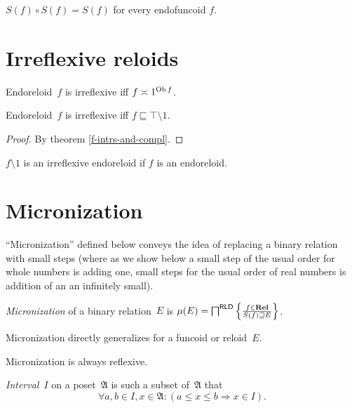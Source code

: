 \begin{conjecture}
$S(f)\circ S(f)=S(f)$ for every endofuncoid $f$.\end{conjecture}

\section{Irreflexive reloids}

\begin{defn}
Endoreloid~$f$ is irreflexive iff $f\asymp 1^{\operatorname{Ob} f}$.
\end{defn}

\begin{prop}
Endoreloid~$f$ is irreflexive iff $f\sqsubseteq \top\setminus 1$.
\end{prop}

\begin{proof}
By theorem \ref{f-intrs-and-compl}.
\end{proof}

\begin{obvious}
$f \setminus 1$ is an irreflexive endoreloid if $f$ is an endoreloid.
\end{obvious}

\section{Micronization}

``Micronization'' defined below conveys the idea of replacing a binary relation
with small steps (where as we show below a small step of the usual order for whole numbers is adding one,
small steps for the usual order of real numbers is addition of an an infinitely small).

\begin{defn}
\emph{Micronization} of a binary relation~$E$ is
$\mu(E) = \bigsqcap^{\mathsf{RLD}} \left\{ \frac{f\in\mathbf{Rel}}{S(f)\sqsupseteq E}\right\}$.
\end{defn}

\begin{rem}
Micronization directly generalizes for a funcoid or reloid~$E$.
\end{rem}

\begin{obvious}
Micronization is always reflexive.
\end{obvious}


\begin{defn}
\emph{Interval}~$I$ on a poset~$\mathfrak{A}$ is such a subset of~$\mathfrak{A}$ that
\[ \forall a,b\in I, x\in\mathfrak{A}:(a\leq x\leq b\Rightarrow x\in I). \]
\end{defn}

